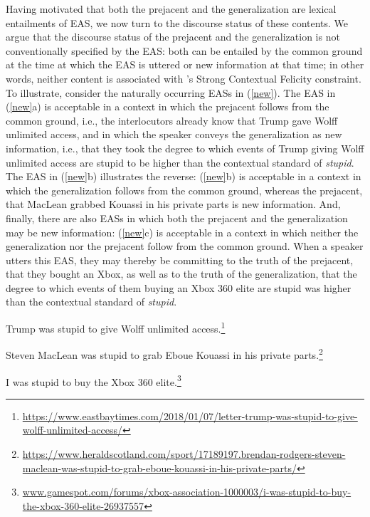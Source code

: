 \documentclass[11pt,fleqn]{article}
\newcommand{\6}{\mbox{$[\hspace*{-.6mm}[$}}
\newcommand{\9}{\mbox{$]\hspace*{-.6mm}]$}}
\newcommand{\citepos}[1]{\citeauthor{#1}'s \citeyear{#1}}
\begin{document}
Having motivated that both the prejacent and the generalization are lexical entailments of EAS, we now turn to the discourse status of these contents. We argue that the discourse status of the prejacent and the generalization is not conventionally specified by the EAS: both can be entailed by the common ground at the time at which the EAS is uttered or new information at that time; in other words, neither content is associated with \citepos{brst-lang11} Strong Contextual Felicity constraint. To illustrate, consider the naturally occurring EASs in (\ref{new}). The EAS in (\ref{new}a) is acceptable in a context in which the prejacent follows from the common ground, i.e., the interlocutors already know that Trump gave Wolff unlimited access, and in which the speaker conveys the generalization as new information, i.e., that they took the degree to which events of Trump giving Wolff unlimited access are stupid to be higher than the contextual standard of {\em stupid}. The EAS in (\ref{new}b) illustrates the reverse: (\ref{new}b) is acceptable in a context in which the generalization follows from the common ground, whereas the prejacent, that MacLean grabbed Kouassi in his private parts is new information. And, finally, there are also EASs in which both the prejacent and the generalization may be new information: (\ref{new}c) is acceptable in a context in which neither the generalization nor the prejacent follow from the common ground. When a speaker utters this EAS, they may thereby be committing to the truth of the prejacent, that they bought an Xbox, as well as to the truth of the generalization, that the degree to which events of them buying an Xbox 360 elite are stupid was higher than the contextual standard of {\em stupid}.

\begin{exe}
\ex\label{new} 

\begin{xlist} 

\ex Trump was stupid to give Wolff unlimited access.\footnote{\url{https://www.eastbaytimes.com/2018/01/07/letter-trump-was-stupid-to-give-wolff-unlimited-access/}}

\ex Steven MacLean was stupid to grab Eboue Kouassi in his private parts.\footnote{\tiny{\url{https://www.heraldscotland.com/sport/17189197.brendan-rodgers-steven-maclean-was-stupid-to-grab-eboue-kouassi-in-his-private-parts/}}}

\ex I was stupid to buy the Xbox 360 elite.\footnote{\url{www.gamespot.com/forums/xbox-association-1000003/i-was-stupid-to-buy-the-xbox-360-elite-26937557}}

\end{xlist}
\end{exe}
\end{document}
